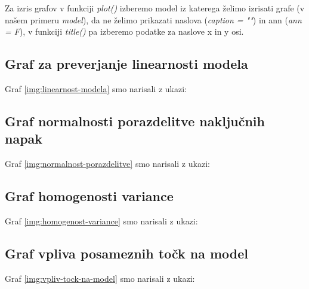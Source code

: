 Za izris grafov v funkciji \emph{plot()} izberemo model iz katerega želimo izrisati grafe
(v našem primeru \emph{model}), da ne želimo prikazati naslova (\emph{caption = ""}) in ann (\emph{ann = F}),
v funkciji \emph{title()} pa izberemo podatke za naslove x in y osi.

\newpage

\subsection{Graf za preverjanje linearnosti modela}

Graf \ref{img:linearnost-modela} smo narisali z ukazi:


\subsection{Graf normalnosti porazdelitve naključnih napak}

Graf \ref{img:normalnost-porazdelitve} smo narisali z ukazi:


\subsection{Graf homogenosti variance}

Graf \ref{img:homogenost-variance} smo narisali z ukazi:


\subsection{Graf vpliva posameznih točk na model}

Graf \ref{img:vpliv-tock-na-model} smo narisali z ukazi:
